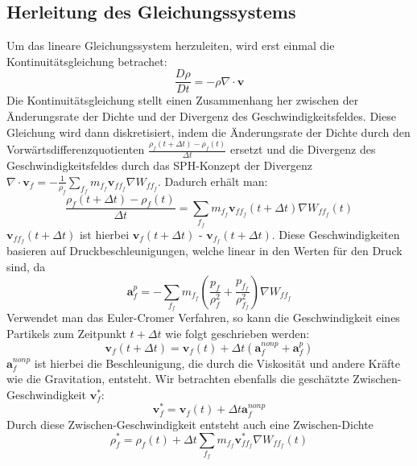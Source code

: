 \documentclass[11pt,
a4paper,
parskip=half, %
BCOR=10mm, %
english,
ngerman]{scrreprt}
\begin{document}
\subsection{Herleitung des Gleichungssystems}
Um das lineare Gleichungssystem herzuleiten, wird erst einmal die Kontinuitätsgleichung betrachet:
\begin{equation}
    \frac{D\rho}{Dt} = -\rho \nabla \cdot \textbf{v}
\end{equation}
Die Kontinuitätsgleichung stellt einen Zusammenhang her zwischen der Änderungsrate der Dichte und der Divergenz des Geschwindigkeitsfeldes.
Diese Gleichung wird dann diskretisiert,
indem die Änderungsrate der Dichte durch den Vorwärtsdifferenzquotienten $\frac{\rho_f(t+\Delta t) - \rho_f(t)}{\Delta t}$ ersetzt und 
die Divergenz des Geschwindigkeitsfeldes durch
das SPH-Konzept der Divergenz $\nabla \cdot \textbf{v}_f = -\frac{1}{\rho_f} \sum_{f_f} m_{f_f} \textbf{v}_{ff_f} \nabla W_{ff_f}$.
Dadurch erhält man:
\begin{equation}
    \label{equation:continuity_discretization}
    \frac{\rho_f(t+\Delta t) - \rho_f(t)}{\Delta t} = \sum_{f_f} m_{f_f} \textbf{v}_{ff_f}(t+\Delta t) \nabla W_{ff_f}(t)
\end{equation}
$\textbf{v}_{ff_f}(t+\Delta t)$ ist hierbei $\textbf{v}_{f}(t+\Delta t)$ - $\textbf{v}_{f_f}(t+\Delta t)$.
Diese Geschwindigkeiten basieren auf Druckbeschleunigungen, welche linear in den Werten für den Druck sind, da
\begin{equation}
    \label{equation:pressure_acceleration}
    \textbf{a}_f^p = -\sum_{f_f} m_{f_f} \left( \frac{p_f}{\rho_f^2} + \frac{p_{f_f}}{\rho_{f_f}^2} \right) \nabla W_{ff_f}
\end{equation}
Verwendet man das Euler-Cromer Verfahren, so kann die Geschwindigkeit eines Partikels zum Zeitpunkt $t + \Delta t$ wie folgt geschrieben werden:
\begin{equation}
    \textbf{v}_f(t + \Delta t) = \textbf{v}_f(t) + \Delta t \left(\textbf{a}_f^{nonp} + \textbf{a}_f^p\right)
\end{equation}
$\textbf{a}_f^{nonp}$ ist hierbei die Beschleunigung, die durch die Viskosität und andere Kräfte wie die Gravitation, entsteht.
Wir betrachten ebenfalls die geschätzte Zwischen-Geschwindigkeit $\textbf{v}_f^*$:
\begin{equation}
    \textbf{v}_f^* = \textbf{v}_f(t) + \Delta t \textbf{a}_f^{nonp}
\end{equation}
Durch diese Zwischen-Geschwindigkeit entsteht auch eine Zwischen-Dichte
\begin{equation}
    \rho_f^* = \rho_f(t) + \Delta t \sum_{f_f} m_{f_f} \textbf{v}_{ff_f}^* \nabla W_{ff_f}(t)
\end{equation}
\end{document}
